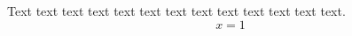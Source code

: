 \documentclass{lcleqno}
\begin{document}
Text text text text text text text text text text text text text.
\begin{equation}x=1\end{equation}
\end{document}
